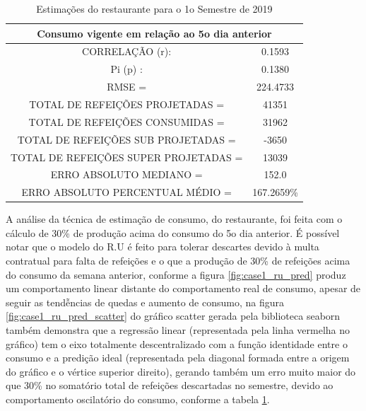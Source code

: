                      \begin{table}[!ht]
                       \centering
                         \begin{tabular}{|c|c|}\hline
                            \multicolumn{2}{c}{Consumo vigente em relação ao 5o dia anterior}\\ \hline
                                CORRELAÇÃO (r): & 0.1593\\
                                Pi (p) : & 0.1380\\
                                RMSE = & 224.4733\\
                                TOTAL DE REFEIÇÕES PROJETADAS = & 41351\\ 
                                TOTAL DE REFEIÇÕES CONSUMIDAS = & 31962\\
                                TOTAL DE REFEIÇÕES SUB PROJETADAS = & -3650\\
                                TOTAL DE REFEIÇÕES SUPER PROJETADAS = & 13039\\
                                ERRO ABSOLUTO MEDIANO = & 152.0\\
                                ERRO ABSOLUTO PERCENTUAL MÉDIO = & 167.2659\% \\\hline
                        \end{tabular}
                        \caption{Estimações do restaurante para o 1o Semestre de 2019}
                        \label{table:case1_rupred}
                    \end{table}
                    
        	        A análise da técnica de estimação de consumo, do restaurante, foi feita com o cálculo de 30\% de produção acima do consumo do 5o dia anterior.
        	        É possível notar que o modelo do R.U é feito para tolerar descartes devido à multa contratual para falta de refeições e o que a produção de 30\% de refeições acima do consumo da semana anterior, conforme a figura  \ref{fig:case1_ru_pred} produz um comportamento linear distante do comportamento real de consumo, apesar de seguir as tendễncias de quedas e aumento de consumo, na figura \ref{fig:case1_ru_pred_scatter} do gráfico scatter gerada pela biblioteca seaborn também demonstra que a regressão linear (representada pela linha vermelha no gráfico) tem o eixo totalmente descentralizado com a função identidade entre o consumo e a predição ideal (representada pela diagonal formada entre a origem do gráfico e o vértice superior direito), gerando também um erro muito maior do que 30\% no somatório total de refeições descartadas no semestre, devido ao comportamento oscilatório do consumo, conforme a tabela \ref{table:case1_rupred}.
